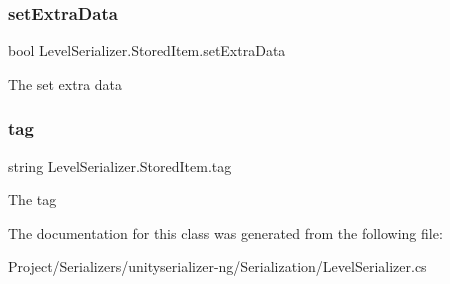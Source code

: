 \subsubsection{\texorpdfstring{set\+Extra\+Data}{setExtraData}}
{\footnotesize\ttfamily bool Level\+Serializer.\+Stored\+Item.\+set\+Extra\+Data}



The set extra data 

\mbox{\label{class_level_serializer_1_1_stored_item_ab053de4512b0a11644a519d03df14072}} 
\subsubsection{\texorpdfstring{tag}{tag}}
{\footnotesize\ttfamily string Level\+Serializer.\+Stored\+Item.\+tag}



The tag 



The documentation for this class was generated from the following file\+:\begin{DoxyCompactItemize}
\item 
Project/\+Serializers/unityserializer-\/ng/\+Serialization/Level\+Serializer.\+cs\end{DoxyCompactItemize}
